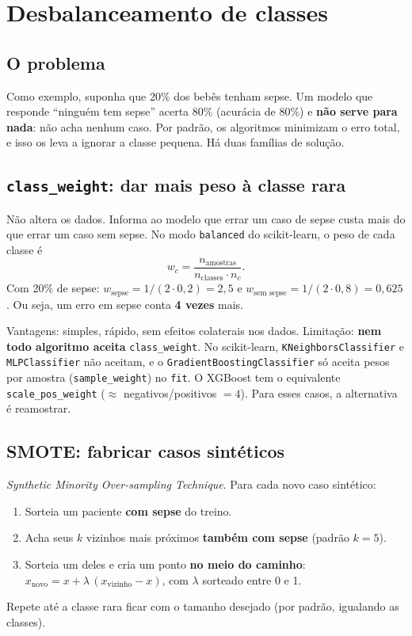 \documentclass[11pt,a4paper]{article}
\newcommand{\cod}[1]{\texttt{#1}}
\begin{document}
\section{Desbalanceamento de classes}

\subsection{O problema}

Como exemplo, suponha que 20\% dos bebês tenham sepse. Um modelo que responde ``ninguém tem sepse'' acerta 80\% (acurácia de 80\%) e
\textbf{não serve para nada}: não acha nenhum caso. Por padrão, os algoritmos minimizam o erro total, e isso os leva a ignorar a classe pequena.
Há duas famílias de solução.

\subsection{\texttt{class\_weight}: dar mais peso à classe rara}

\begin{conceito}
Não altera os dados. Informa ao modelo que errar um caso de sepse custa mais do que errar um caso sem sepse. No modo \cod{balanced}
do scikit-learn, o peso de cada classe é
\[
w_c = \frac{n_{\text{amostras}}}{n_{\text{classes}}\cdot n_c}.
\]
Com 20\% de sepse: $w_{\text{sepse}} = 1/(2\cdot 0{,}2) = 2{,}5$ e $w_{\text{sem sepse}} = 1/(2\cdot 0{,}8)=0{,}625$. Ou seja, um erro em sepse conta \textbf{4 vezes} mais.
\end{conceito}

Vantagens: simples, rápido, sem efeitos colaterais nos dados. Limitação: \textbf{nem todo algoritmo aceita} \cod{class\_weight}. No scikit-learn, \cod{KNeighborsClassifier} e \cod{MLPClassifier} não aceitam, e o \cod{GradientBoostingClassifier} só aceita pesos por amostra (\cod{sample\_weight}) no \cod{fit}. O XGBoost tem o equivalente \cod{scale\_pos\_weight} ($\approx$ negativos/positivos $=4$).
Para esses casos, a alternativa é reamostrar.

\subsection{SMOTE: fabricar casos sintéticos}

\begin{conceito}[SMOTE]
\emph{Synthetic Minority Over-sampling Technique}. Para cada novo caso sintético:
\begin{enumerate}
  \item Sorteia um paciente \textbf{com sepse} do treino.
  \item Acha seus $k$ vizinhos mais próximos \textbf{também com sepse} (padrão $k=5$).
  \item Sorteia um deles e cria um ponto \textbf{no meio do caminho}:
  $x_{\text{novo}} = x + \lambda\,(x_{\text{vizinho}} - x)$, com $\lambda$ sorteado entre 0 e 1.
\end{enumerate}
Repete até a classe rara ficar com o tamanho desejado (por padrão, igualando as classes).
\end{conceito}
\end{document}
